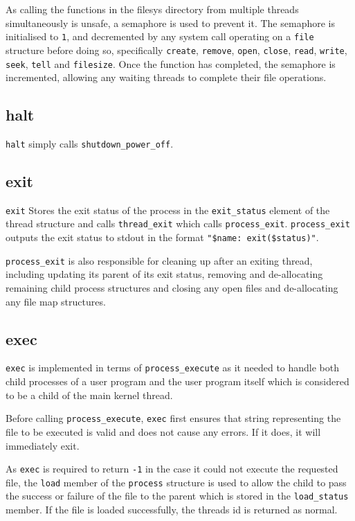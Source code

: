 \documentclass{article}
\begin{document}
As calling the functions in the filesys directory from multiple threads simultaneously is unsafe, a semaphore is used to prevent it. The semaphore is initialised to \verb!1!, and decremented by any system call operating on a \verb!file! structure before doing so, specifically \verb!create!, \verb!remove!, \verb!open!, \verb!close!, \verb!read!, \verb!write!, \verb!seek!, \verb!tell! and \verb!filesize!. Once the function has completed, the semaphore is incremented, allowing any waiting threads to complete their file operations.

\subsection{halt}
\label{sec:halt}

\verb!halt! simply calls \verb!shutdown_power_off!.

\subsection{exit}
\label{sec:exit}

\verb!exit! Stores the exit status of the process in the \verb!exit_status! element of the thread structure and calls \verb!thread_exit! which calls \verb!process_exit!. \verb!process_exit! outputs the exit status to stdout in the format \verb!"$name: exit($status)"!.

\verb!process_exit! is also responsible for cleaning up after an exiting thread, including updating its parent of its exit status, removing and de-allocating remaining child process structures and closing any open files and de-allocating any file map structures.

\subsection{exec}
\label{sec:exec}

\verb!exec! is implemented in terms of \verb!process_execute! as it needed to handle both child processes of a user program and the user program itself which is considered to be a child of the main kernel thread.

Before calling \verb!process_execute!, \verb!exec! first ensures that string representing the file to be executed is valid and does not cause any errors. If it does, it will immediately exit.

As \verb!exec! is required to return \verb!-1! in the case it could not execute the requested file, the \verb!load! member of the \verb!process! structure is used to allow the child to pass the success or failure of the file to the parent which is stored in the \verb!load_status! member. If the file is loaded successfully, the threads id is returned as normal.
\end{document}

